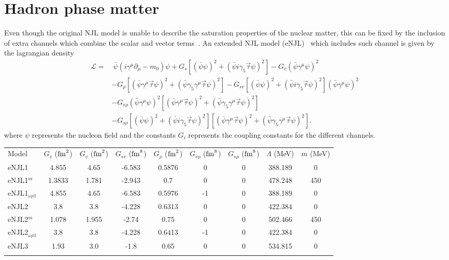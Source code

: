 \documentclass{ws-ijmpcs}
\begin{document}
\section{Hadron phase matter}

Even though the original NJL model is unable to describe the saturation properties of the nuclear matter, this can be fixed by the inclusion of extra channels which combine the scalar and vector terms~\cite{Koch1987}. An extended NJL model (eNJL)~\cite{Pais2016} which includes such channel is given by the lagrangian density
\begin{equation}\label{Eq:Lagrangiana_eNLJ_Pais}
\begin{split}
	\mathcal{L} =&~ \bar{\psi}(i\gamma^\mu\partial_\mu - m_0)\psi + G_s[(\bar{\psi}\psi)^2 + (\bar{\psi}i\gamma_5\vec{\tau}\psi)^2] - G_v(\bar{\psi}\gamma^\mu\psi)^2 \\
	& - G_\rho[(\bar{\psi}\gamma^\mu\vec{\tau}\psi)^2 + (\bar{\psi}\gamma_5\gamma^\mu\vec{\tau}\psi)^2] - G_{sv}[(\bar{\psi}\psi)^2 + (\bar{\psi}i\gamma_5\vec{\tau}\psi)^2](\bar{\psi}\gamma^\mu\psi)^2 \\
	& - G_{v\rho}(\bar{\psi}\gamma^\mu\psi)^2[(\bar{\psi}\gamma^\mu\vec{\tau}\psi)^2 + (\bar{\psi}\gamma_5\gamma^\mu\vec{\tau}\psi)^2] \\
	& - G_{s\rho} [(\bar{\psi}\psi)^2 + (\bar{\psi}i\gamma_5\vec{\tau}\psi)^2][(\bar{\psi}\gamma^\mu\vec{\tau}\psi)^2 + (\bar{\psi}\gamma_5\gamma^\mu\vec{\tau}\psi)^2].
\end{split}
\end{equation}
%
where $\psi$ represents the nucleon field and the constants $G_i$ represents the coupling constants for the different channels.
%
\begin{table}[!hb]
{\begin{tabular}{@{}lcccccccc@{}}\toprule
Model & $G_s$ ($\rm{fm}^2$) & $G_v$ ($\rm{fm}^2$) & $G_{sv}$ ($\rm{fm}^8$) & $G_\rho$ ($\rm{fm}^2$) & $G_{v\rho}$ ($\rm{fm}^8$) & $G_{s\rho}$ ($\rm{fm}^8$) & $\Lambda$ (MeV) & $m$ (MeV) \\ \colrule
eNJL1 & 4.855 & 4.65 & -6.583 & 0.5876 & 0 & 0 & 388.189 & 0 \\
eNJL1$^m$ & 1.3833 & 1.781 & -2.943 & 0.7 & 0 & 0 & 478.248 & 450 \\
eNJL1$_{\omega\rho 1}$ & 4.855 & 4.65 & -6.583 & 0.5976 & -1 & 0 & 388.189 & 0 \\
eNJL2 & 3.8 & 3.8 & -4.228 & 0.6313 & 0 & 0 & 422.384 & 0 \\
eNJL2$^m$ & 1.078 & 1.955 & -2.74 & 0.75 & 0 & 0 & 502.466 & 450 \\
eNJL2$_{\omega\rho 1}$ & 3.8 & 3.8 & -4.228 & 0.6413 & -1 & 0 & 422.384 & 0 \\
eNJL3 & 1.93 & 3.0 & -1.8 & 0.65 & 0 & 0 & 534.815 & 0 \\
\botrule
\end{tabular}\label{Tab:Parametros_eNJL}}
\end{table}
\end{document}

